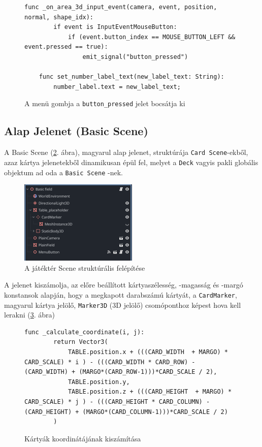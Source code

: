 \begin{figure}[H]
    \centering
    \begin{lstlisting}[language=GDScript]
    func _on_area_3d_input_event(camera, event, position, normal, shape_idx):
        if event is InputEventMouseButton:
            if (event.button_index == MOUSE_BUTTON_LEFT && event.pressed == true):
                emit_signal("button_pressed")
    
    func set_number_label_text(new_label_text: String):
        number_label.text = new_label_text;
    \end{lstlisting}
    \caption{A menü gombja a \lstinline{button_pressed} jelet bocsátja ki}
    \label{code:button_pressed_signal}
\end{figure}

\subsection{Alap Jelenet (Basic Scene)}

A Basic Scene (\ref{img:basic_scene}. ábra), magyarul alap jelenet,  struktúrája \lstinline{Card Scene}-ekből, azaz kártya jelenetekből  dinamikusan épül fel, melyet a \lstinline|Deck| vagyis pakli globális objektum ad oda a \lstinline|Basic Scene| -nek. 
\begin{figure}[H]
    \centering
    \includegraphics[width=0.5\textwidth]{img/basic_field_scene_structure.png}
    \caption{A játéktér Scene struktúrális felépítése}
    \label{img:basic_scene}  
\end{figure}

A jelenet kiszámolja, az előre beállított kártyaszélesség, -magasság és -margó konstansok alapján, hogy a megkapott darabszámú kártyát, a \lstinline|CardMarker|, magyarul kártya jelölő, \lstinline|Marker3D| (3D jelölő) csomóponthoz \cite{Marker3D69:online} képest hova kell lerakni (\ref{code:calculate_coordinate}. ábra)
\begin{figure}[H]
    \centering
    \begin{lstlisting}[language=GDScript]
        func _calculate_coordinate(i, j):
        return Vector3(
            TABLE.position.x + (((CARD_WIDTH  + MARGO) * CARD_SCALE) * i ) - (((CARD_WIDTH * CARD_ROW) - (CARD_WIDTH) + (MARGO*(CARD_ROW-1)))*CARD_SCALE / 2),
            TABLE.position.y,
            TABLE.position.z + (((CARD_HEIGHT  + MARGO) * CARD_SCALE) * j ) - (((CARD_HEIGHT * CARD_COLUMN) - (CARD_HEIGHT) + (MARGO*(CARD_COLUMN-1)))*CARD_SCALE / 2)
        )
    \end{lstlisting}
    \caption{Kártyák koordinátájának kiszámítása}
    \label{code:calculate_coordinate}
\end{figure}

